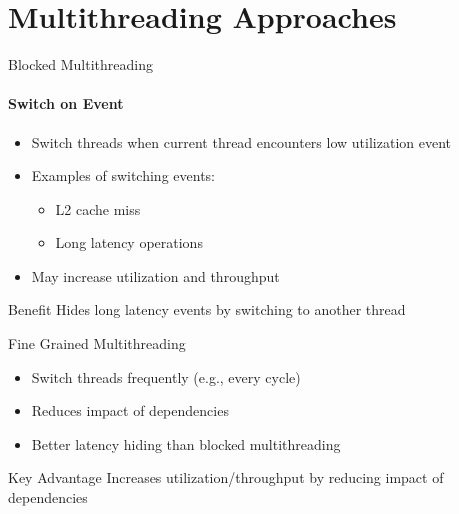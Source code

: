\documentclass[aspectratio=169,12pt]{beamer}
\begin{document}
\section{Multithreading Approaches}

\begin{frame}{Blocked Multithreading}
\framesubtitle{Switch on Event}

\begin{itemize}
    \item Switch threads when current thread encounters low utilization event
    \item Examples of switching events:
    \begin{itemize}
        \item L2 cache miss
        \item Long latency operations
    \end{itemize}
    \item May increase utilization and throughput
\end{itemize}

\begin{block}{Benefit}
Hides long latency events by switching to another thread
\end{block}
\end{frame}

\begin{frame}{Fine Grained Multithreading}
\begin{itemize}
    \item Switch threads frequently (e.g., every cycle)
    \item Reduces impact of dependencies
    \item Better latency hiding than blocked multithreading
\end{itemize}

\begin{block}{Key Advantage}
Increases utilization/throughput by reducing impact of dependencies
\end{block}
\end{frame}
\end{document}
